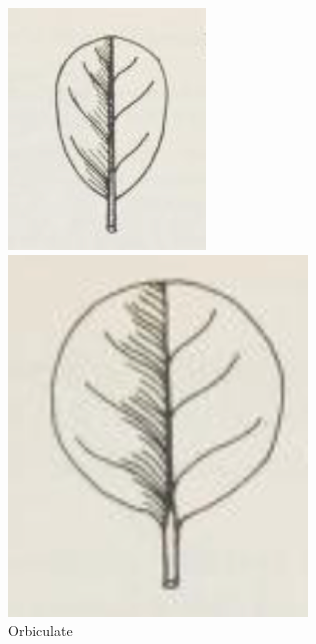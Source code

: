 \documentclass[12pt,english]{article}
\begin{document}
\begin{figure}[!hbt]
\begin{centre}
\begin{minipage}{0.19\textwidth}
		\includegraphics[width=\textwidth]{../code/contour/original/obovate}
	\end{minipage}
	\begin{minipage}{0.19\textwidth}
		\caption{Orbiculate}
		\includegraphics[width=\textwidth]{../code/contour/original/orbiculate}

\end{minipage}
\end{centre}
\end{figure}
\end{document}
